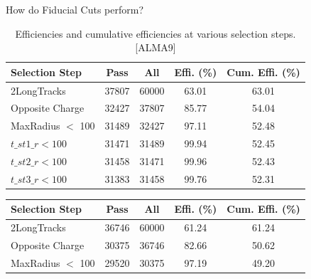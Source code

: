\begin{frame}{How do Fiducial Cuts perform?}
    \begin{table}[h!]
        \centering
        \small
        \begin{tabular}{|l|c|c|c|c|}
        \hline
        \textbf{Selection Step} & \textbf{Pass} & \textbf{All} & \textbf{Effi. (\%)} & \textbf{Cum. Effi. (\%)} \\ \hline
        2LongTracks              & 37807        & 60000       & 63.01                   & 63.01                              \\ \hline
        Opposite Charge          & 32427        & 37807       & 85.77                   & 54.04                              \\ \hline
        MaxRadius $<$ 100        & 31489    & 32427       & 97.11                   & 52.48                              \\ \hline
        $t\_st1\_r < 100$        & 31471        & 31489       & 99.94                   & 52.45                              \\ \hline
        $t\_st2\_r < 100$        & 31458        & 31471       & 99.96                   & 52.43                              \\ \hline
        $t\_st3\_r < 100$        & 31383        & 31458       & 99.76                   & 52.31                              \\ \hline
        \end{tabular}
        \caption{Efficiencies and cumulative efficiencies at various selection steps. [ALMA9]}
        \label{table:efficiency}
    \end{table}
    \vspace{-0.5cm}
    \begin{table}[h!]
        \centering
        \small
        \begin{tabular}{|l|c|c|c|c|}
        \hline
        \textbf{Selection Step} & \textbf{Pass} & \textbf{All} & \textbf{Effi. (\%)} & \textbf{Cum. Effi. (\%)} \\ \hline
        2LongTracks              & 36746        & 60000       & 61.24                   & 61.24                              \\ \hline
        Opposite Charge          & 30375        & 36746       & 82.66                   & 50.62                              \\ \hline
        MaxRadius $<$ 100 & 29520    & 30375       & 97.19                   & 49.20                              \\ \hline

\end{tabular}
\end{table}
\end{frame}

